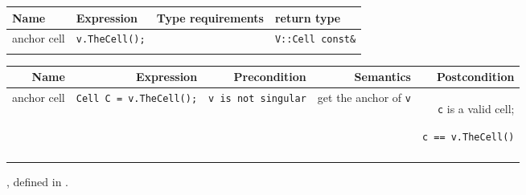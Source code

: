 \begin{tabular}{llll} \\
  \hline
  \bf  Name  &\bf  Expression  &\bf  Type requirements  & \bf  return type  \\ 
  \hline
  anchor cell  &
  {\tt v.TheCell();} &
  ~ &
  {\tt V::Cell const\&} 
  \\ 
  \hline
  \\
\end{tabular}



\begin{tabularx}{14cm}{RRRRR} \\
  \hline     
  \bf  Name     &
  \bf  Expression &
  \bf  Precondition&
  \bf  Semantics &
  \bf  Postcondition
  \\
  \hline
  anchor cell  &
  {\tt Cell C = v.TheCell();} &
  {\tt v is not singular} &
  get the anchor of {\tt v} & 
  {\tt c} is a valid cell; 
  \par
  {\tt c == v.TheCell()}
  \\ 
  \hline
  \\
\end{tabularx}

\W{}

, 
defined in  
.

\W{}


 ~
 ~
\\
 ~
 ~
 ~
\\
 ~
 ~
  

